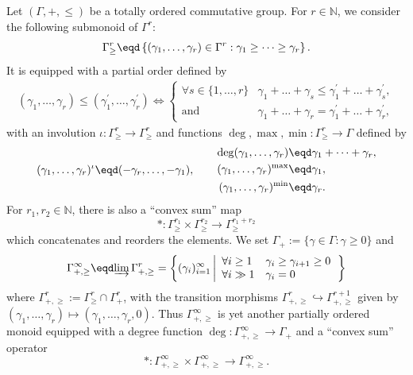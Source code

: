 Let $(\Gamma,+,\leq)$ be a totally ordered commutative group. For $r\in\mathbb{N}$, we consider the following submonoid of $\Gamma^{r}$:
\[
\Gamma_{\geq}^{r}\eqd\left\{ (\gamma_{1},\dots,\gamma_{r})\in\Gamma^{r}:\gamma_{1}\geq\dots\geq\gamma_{r}\right\}.
\]
It is equipped with a partial order defined by
\begin{multline*}
(\gamma_{1},\dots,\gamma_{r})\leq(\gamma_{1}^{\prime},\dots,\gamma_{r}^{\prime})\iff\!
\begin{cases}
\forall s\in\{1,\dots,r\}\! & \gamma_{1}+\dots+\gamma_{s}\leq\gamma_{1}^{\prime}+\dots+\gamma_{s}^{\prime},\\
\text{and} & \gamma_{1}+\dots+\gamma_{r}=\gamma_{1}^{\prime}+\dots+\gamma_{r}^{\prime},
\end{cases}\!\!
\end{multline*}
with an involution $\iota:\Gamma_{\geq}^{r}\rightarrow\Gamma_{\geq}^{r}$ and functions $\deg,\max,\min:\Gamma_{\geq}^{r}\rightarrow\Gamma$ defined by
\[
(\gamma_{1},\dots,\gamma_{r})^{\iota}\eqd(-\gamma_{r},\dots,-\gamma_{1}),\qquad
\begin{aligned}
\deg(\gamma_{1},\dots,\gamma_{r}) & \eqd \gamma_{1}+\dots+\gamma_{r},\\
(\gamma_{1},\dots,\gamma_{r})^{\max} & \eqd \gamma_{1},\\
(\gamma_{1},\dots,\gamma_{r})^{\min} & \eqd \gamma_{r}.
\end{aligned}
\]
For $r_{1},r_{2}\in\mathbb{N}$, there is also a ``convex sum'' map
\[
\ast:\Gamma_{\geq}^{r_{1}}\times\Gamma_{\geq}^{r_{2}}\rightarrow\Gamma_{\geq}^{r_{1}+r_{2}}
\]
which concatenates and reorders the elements. We set $\Gamma_{+}:=\{\gamma\in\Gamma:\gamma\geq0\}$ and
\[
\Gamma_{+,\geq}^{\infty}\eqd\underrightarrow{\lim}\,\Gamma_{+,\geq}^{r}=\left\{ (\gamma_{i})_{i=1}^{\infty}\left|
\begin{array}{ll}
\forall i\geq1 & \gamma_{i}\geq\gamma_{i+1}\geq0\\
\forall i\gg1 & \gamma_{i}=0
\end{array}\right.\right\}
\]
where $\Gamma_{+,\geq}^{r}:=\Gamma_{\geq}^{r}\cap\Gamma_{+}^{r}$, with the transition morphisms $\Gamma_{+,\geq}^{r}\hookrightarrow\Gamma_{+,\geq}^{r+1}$ given by $(\gamma_{1},\dots,\gamma_{r})\mapsto(\gamma_{1},\dots,\gamma_{r},0)$. Thus $\Gamma_{+,\geq}^{\infty}$ is yet another partially ordered monoid equipped with a degree function $\deg:\Gamma_{+,\geq}^{\infty}\rightarrow\Gamma_{+}$ and a ``convex sum'' operator
\[
\ast:\Gamma_{+,\geq}^{\infty}\times\Gamma_{+,\geq}^{\infty}\rightarrow\Gamma_{+,\geq}^{\infty}.
\]
